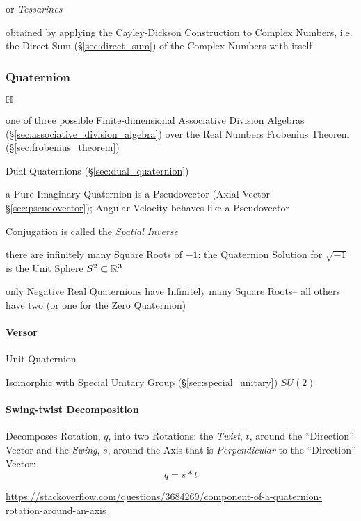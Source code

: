 or \emph{Tessarines}

obtained by applying the Cayley-Dickson Construction to Complex Numbers, i.e.
the Direct Sum (\S\ref{sec:direct_sum}) of the Complex Numbers with itself



\subsubsection{Quaternion}\label{sec:quaternion}

$\mathbb{H}$

one of three possible Finite-dimensional Associative Division Algebras
(\S\ref{sec:associative_division_algebra}) over the Real Numbers \fist
Frobenius Theorem (\S\ref{sec:frobenius_theorem})

\fist Dual Quaternions (\S\ref{sec:dual_quaternion})

a Pure Imaginary Quaternion is a Pseudovector (Axial Vector
\S\ref{sec:pseudovector}); Angular Velocity behaves like a Pseudovector

Conjugation is called the \emph{Spatial Inverse}

there are infinitely many Square Roots of $-1$: the Quaternion Solution for
$\sqrt{-1}$ is the Unit Sphere $S^2 \subset \mathbb{R}^3$

only Negative Real Quaternions have Infinitely many Square Roots-- all others
have two (or one for the Zero Quaternion)



\paragraph{Versor}\label{sec:versor}

Unit Quaternion

Isomorphic with Special Unitary Group (\S\ref{sec:special_unitary}) $SU(2)$



\paragraph{Swing-twist Decomposition}\label{sec:swing_twist}

Decomposes Rotation, $q$, into two Rotations: the \emph{Twist}, $t$, around the
``Direction'' Vector and the \emph{Swing}, $s$, around the Axis that is
\emph{Perpendicular} to the ``Direction'' Vector:
\[
  q = s * t
\]

\url{https://stackoverflow.com/questions/3684269/component-of-a-quaternion-rotation-around-an-axis}

